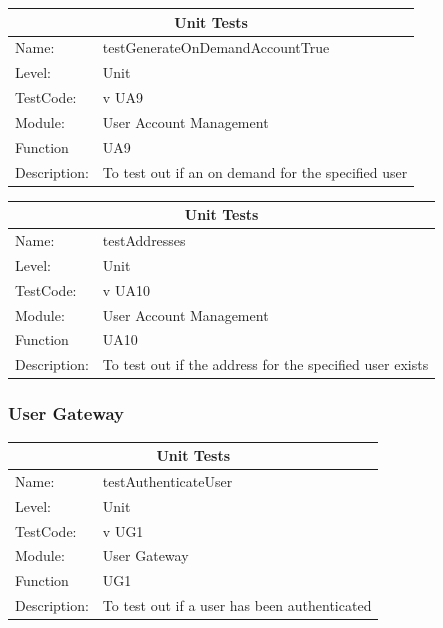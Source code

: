 \documentclass[12pt]{article}
\begin{document}
\begin{center}
\begin{tabular}{|l|p{12cm}|}
\hline
\multicolumn{2}{|c|}{\bf Unit Tests} \\
\hline
 Name: & testGenerateOnDemandAccountTrue\\
\hline
Level: & Unit \\
\hline
TestCode: & v UA9 \\
\hline
Module:& User Account Management\\
\hline
Function & UA9 \\
\hline
Description: & To test out if an on demand for the specified user \\
\hline

\end{tabular}
\end{center}

\begin{center}
\begin{tabular}{|l|p{12cm}|}
\hline
\multicolumn{2}{|c|}{\bf Unit Tests} \\
\hline
 Name: & testAddresses\\
\hline
Level: & Unit \\
\hline
TestCode: & v UA10 \\
\hline
Module:& User Account Management\\
\hline
Function & UA10 \\
\hline
Description: & To test out if the address for the specified user exists \\
\hline

\end{tabular}
\end{center}

\subsubsection{User Gateway}
\begin{center}
\begin{tabular}{|l|p{12cm}|}
\hline
\multicolumn{2}{|c|}{\bf Unit Tests} \\
\hline
 Name: & testAuthenticateUser \\
\hline
Level: & Unit \\
\hline
TestCode: & v UG1 \\
\hline
Module:& User Gateway\\
\hline
Function & UG1 \\
\hline
Description: & To test out if a user has been authenticated \\
\hline

\end{tabular}
\end{center}
\end{document}
